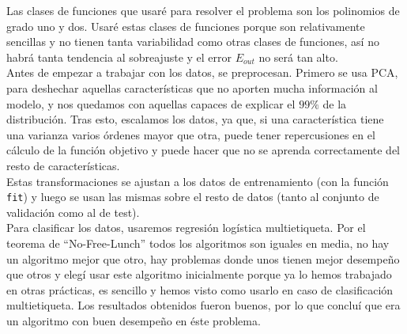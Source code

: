 \documentclass{article}
\begin{document}
Las clases de funciones que usaré para resolver el problema son los polinomios de grado uno y dos. Usaré estas clases de funciones porque son relativamente sencillas y no tienen tanta variabilidad como otras clases de funciones, así no habrá tanta tendencia al sobreajuste y el error $E_{out}$ no será tan alto.\\

Antes de empezar a trabajar con los datos, se preprocesan. Primero se usa PCA, para deshechar aquellas características que no aporten mucha información al modelo, y nos quedamos con aquellas capaces de explicar el $99\%$ de la distribución. Tras esto, escalamos los datos, ya que, si una característica tiene una varianza varios órdenes mayor que otra, puede tener repercusiones en el cálculo de la función objetivo y puede hacer que no se aprenda correctamente del resto de características.\\
Estas transformaciones se ajustan a los datos de entrenamiento (con la función \texttt{fit}) y luego se usan las mismas sobre el resto de datos (tanto al conjunto de validación como al de test).\\

Para clasificar los datos, usaremos regresión logística multietiqueta. Por el teorema de ``No-Free-Lunch'' todos los algoritmos son iguales en media, no hay un algoritmo mejor que otro, hay problemas donde unos tienen mejor desempeño que otros y elegí usar este algoritmo inicialmente porque ya lo hemos trabajado en otras prácticas, es sencillo y hemos visto como usarlo en caso de clasificación multietiqueta. Los resultados obtenidos fueron buenos, por lo que concluí que era un algoritmo con buen desempeño en éste problema.\\
\end{document}
